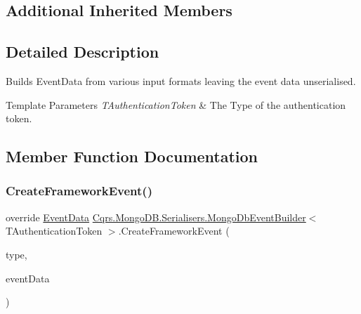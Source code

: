 \subsection*{Additional Inherited Members}


\subsection{Detailed Description}
Builds Event\+Data from various input formats leaving the event data unserialised. 


\begin{DoxyTemplParams}{Template Parameters}
{\em T\+Authentication\+Token} & The Type of the authentication token.\\
\hline
\end{DoxyTemplParams}


\subsection{Member Function Documentation}
\mbox{\label{classCqrs_1_1MongoDB_1_1Serialisers_1_1MongoDbEventBuilder_a06afbb994fd3f679f275dea3d1d60c6e_a06afbb994fd3f679f275dea3d1d60c6e}} 
\subsubsection{\texorpdfstring{Create\+Framework\+Event()}{CreateFrameworkEvent()}}
{\footnotesize\ttfamily override \hyperlink{classCqrs_1_1Events_1_1EventData}{Event\+Data} \hyperlink{classCqrs_1_1MongoDB_1_1Serialisers_1_1MongoDbEventBuilder}{Cqrs.\+Mongo\+D\+B.\+Serialisers.\+Mongo\+Db\+Event\+Builder}$<$ T\+Authentication\+Token $>$.Create\+Framework\+Event (\begin{DoxyParamCaption}\item[{string}]{type,  }\item[{\hyperlink{interfaceCqrs_1_1Events_1_1IEvent}{I\+Event}$<$ T\+Authentication\+Token $>$}]{event\+Data }\end{DoxyParamCaption})\hspace{0.3cm}{\ttfamily [virtual]}}



